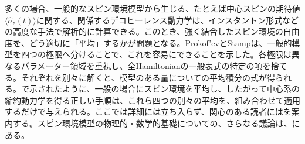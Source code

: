 多くの場合、一般的なスピン環境模型から生じる、たとえば中心スピンの期待値$\langle\hat\sigma_z(t)\rangle$に関する、関係するデコヒーレンス動力学は、インスタントン形式\cite{ref199}などの高度な手法で解析的に計算できる。このとき、強く結合したスピン環境の自由度を、どう適切に「平均」するかが問題となる。Prokof'evとStamp\cite{ref199}は、一般的模型を四つの極限へ分けることで、これを容易にできることを示した。各極限は異なるパラメーター領域を重視し、全Hamiltonianの一般表式の特定の項を捨てる。それぞれを別々に解くと、模型のある量についての平均積分の式が得られる。\cite{ref199}で示されたように、一般の場合にスピン環境を平均し、したがって中心系の縮約動力学を得る正しい手順は、これら四つの別々の平均を、組み合わせて適用するだけで与えられる。ここでは詳細には立ち入らず、関心のある読者には\cite{ref199}を案内する。スピン環境模型の物理的・数学的基礎についての、さらなる議論は、\cite{ref200,ref210,ref214,ref216}にある。
